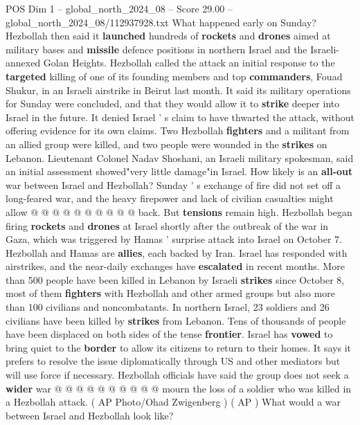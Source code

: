 \begin{textsample}{POS Dim 1 – global\_north\_2024\_08 – Score 29.00 – global\_north\_2024\_08/112937928.txt}  \label{ex:f1_pos_072}
What happened early on Sunday?
Hezbollah then said it \textbf{launched} hundreds of \textbf{rockets} and \textbf{drones} aimed at military bases and \textbf{missile} defence positions in northern Israel and the Israeli-annexed Golan Heights.
Hezbollah called the attack an initial response to the \textbf{targeted} killing of one of its founding members and top \textbf{commanders}, Fouad Shukur, in an Israeli airstrike in Beirut last month.
It said its military operations for Sunday were concluded, and that they would allow it to \textbf{strike} deeper into Israel in the future.
It denied Israel ' s claim to have thwarted the attack, without offering evidence for its own claims.
Two Hezbollah \textbf{fighters} and a militant from an allied group were killed, and two people were wounded in the \textbf{strikes} on Lebanon.
Lieutenant Colonel Nadav Shoshani, an Israeli military spokesman, said an initial assessment showed"very little damage"in Israel.
How likely is an \textbf{all-out} war between Israel and Hezbollah?
Sunday ' s exchange of fire did not set off a long-feared war, and the heavy firepower and lack of civilian casualties might allow @ @ @ @ @ @ @ @ @ @ back.
But \textbf{tensions} remain high.
Hezbollah began firing \textbf{rockets} and \textbf{drones} at Israel shortly after the outbreak of the war in Gaza, which was triggered by Hamas ' surprise attack into Israel on October 7.
Hezbollah and Hamas are \textbf{allies}, each backed by Iran.
Israel has responded with airstrikes, and the near-daily exchanges have \textbf{escalated} in recent months.
More than 500 people have been killed in Lebanon by Israeli \textbf{strikes} since October 8, most of them \textbf{fighters} with Hezbollah and other armed groups but also more than 100 civilians and noncombatants.
In northern Israel, 23 soldiers and 26 civilians have been killed by \textbf{strikes} from Lebanon.
Tens of thousands of people have been displaced on both sides of the tense \textbf{frontier}.
Israel has \textbf{vowed} to bring quiet to the \textbf{border} to allow its citizens to return to their homes.
It says it prefers to resolve the issue diplomatically through US and other mediators but will use force if necessary.
Hezbollah officials have said the group does not seek a \textbf{wider} war @ @ @ @ @ @ @ @ @ @ mourn the loss of a soldier who was killed in a Hezbollah attack. ( AP Photo/Ohad Zwigenberg ) ( AP ) What would a war between Israel and Hezbollah look like?

\end{textsample}

